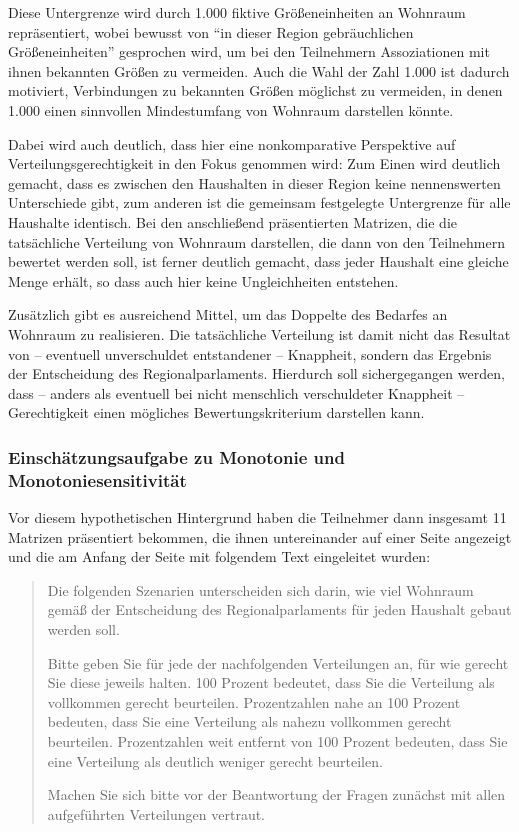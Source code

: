 \documentclass[a4paper]{thesis}
\begin{document}
Diese Untergrenze wird durch 1.000 fiktive Größeneinheiten an Wohnraum repräsentiert, wobei bewusst von \enquote{in dieser Region gebräuchlichen Größeneinheiten} gesprochen wird, um bei den Teilnehmern Assoziationen mit ihnen bekannten Größen zu vermeiden. Auch die Wahl der Zahl 1.000 ist dadurch motiviert, Verbindungen zu bekannten Größen möglichst zu vermeiden, in denen 1.000 einen sinnvollen Mindestumfang von Wohnraum darstellen könnte.

Dabei wird auch deutlich, dass hier eine nonkomparative Perspektive auf Verteilungsgerechtigkeit in den Fokus genommen wird: Zum Einen wird deutlich gemacht, dass es zwischen den Haushalten in dieser Region keine nennenswerten Unterschiede gibt, zum anderen ist die gemeinsam festgelegte Untergrenze für alle Haushalte identisch. Bei den anschließend präsentierten Matrizen, die die tatsächliche Verteilung von Wohnraum darstellen, die dann von den Teilnehmern bewertet werden soll, ist ferner deutlich gemacht, dass jeder Haushalt eine gleiche Menge erhält, so dass auch hier keine Ungleichheiten entstehen.

Zusätzlich gibt es ausreichend Mittel, um das Doppelte des Bedarfes an Wohnraum zu realisieren. Die tatsächliche Verteilung ist damit nicht das Resultat von -- eventuell unverschuldet entstandener -- Knappheit, sondern das Ergebnis der Entscheidung des Regionalparlaments. Hierdurch soll sichergegangen werden, dass -- anders als eventuell bei nicht menschlich verschuldeter Knappheit -- Gerechtigkeit einen mögliches Bewertungskriterium darstellen kann.

\subsubsection{Einschätzungsaufgabe zu Monotonie und Monotoniesensitivität}
Vor diesem hypothetischen Hintergrund haben die Teilnehmer dann insgesamt 11 Matrizen präsentiert bekommen, die ihnen untereinander auf einer Seite angezeigt und die am Anfang der Seite mit folgendem Text eingeleitet wurden:

\begin{quote}
Die folgenden Szenarien unterscheiden sich darin, wie viel Wohnraum gemäß der Entscheidung des Regionalparlaments für jeden Haushalt gebaut werden soll.

Bitte geben Sie für jede der nachfolgenden Verteilungen an, für wie gerecht Sie diese jeweils halten. 100 Prozent bedeutet, dass Sie die Verteilung als vollkommen gerecht beurteilen. Prozentzahlen nahe an 100 Prozent bedeuten, dass Sie eine Verteilung als nahezu vollkommen gerecht beurteilen. Prozentzahlen weit entfernt von 100 Prozent bedeuten, dass Sie eine Verteilung als deutlich weniger gerecht beurteilen.

Machen Sie sich bitte vor der Beantwortung der Fragen zunächst mit allen aufgeführten Verteilungen vertraut.
\end{quote}
\end{document}
